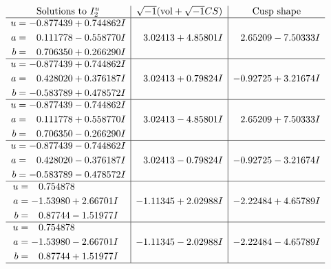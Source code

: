\documentclass[1p]{elsarticle_modified}
\theoremstyle{definition}
\newcommand{\I}{\sqrt{-1}}
\begin{document}
$$\begin{array}{c|c|c}  
\text{Solutions to }I^u_{2}& \I (\text{vol} + \sqrt{-1}CS) & \text{Cusp shape}\\
 \hline 
\begin{aligned}
u &= -0.877439 + 0.744862 I \\
a &= \phantom{-}0.111778 - 0.558770 I \\
b &= \phantom{-}0.706350 + 0.266290 I\end{aligned}
 & \phantom{-}3.02413 + 4.85801 I & \phantom{-}2.65209 - 7.50333 I \\ \hline\begin{aligned}
u &= -0.877439 + 0.744862 I \\
a &= \phantom{-}0.428020 + 0.376187 I \\
b &= -0.583789 + 0.478572 I\end{aligned}
 & \phantom{-}3.02413 + 0.79824 I & -0.92725 + 3.21674 I \\ \hline\begin{aligned}
u &= -0.877439 - 0.744862 I \\
a &= \phantom{-}0.111778 + 0.558770 I \\
b &= \phantom{-}0.706350 - 0.266290 I\end{aligned}
 & \phantom{-}3.02413 - 4.85801 I & \phantom{-}2.65209 + 7.50333 I \\ \hline\begin{aligned}
u &= -0.877439 - 0.744862 I \\
a &= \phantom{-}0.428020 - 0.376187 I \\
b &= -0.583789 - 0.478572 I\end{aligned}
 & \phantom{-}3.02413 - 0.79824 I & -0.92725 - 3.21674 I \\ \hline\begin{aligned}
u &= \phantom{-}0.754878\phantom{ +0.000000I} \\
a &= -1.53980 + 2.66701 I \\
b &= \phantom{-}0.87744 - 1.51977 I\end{aligned}
 & -1.11345 + 2.02988 I & -2.22484 + 4.65789 I \\ \hline\begin{aligned}
u &= \phantom{-}0.754878\phantom{ +0.000000I} \\
a &= -1.53980 - 2.66701 I \\
b &= \phantom{-}0.87744 + 1.51977 I\end{aligned}
 & -1.11345 - 2.02988 I & -2.22484 - 4.65789 I\\
 \hline 
 \end{array}$$\newpage
\end{document}

